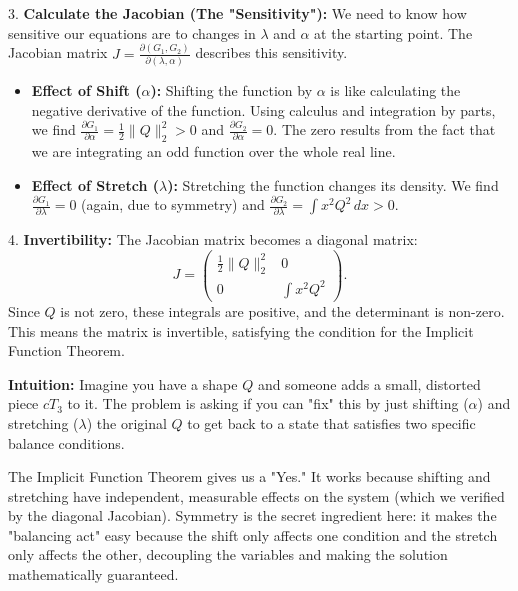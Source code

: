 \begin{solution}
\par\vspace{\baselineskip}
3. \textbf{Calculate the Jacobian (The "Sensitivity"):} We need to know how sensitive our equations are to changes in $\lambda$ and $\alpha$ at the starting point.
The Jacobian matrix $J = \frac{\partial(G_1, G_2)}{\partial(\lambda, \alpha)}$ describes this sensitivity.
\begin{itemize}
    \item \textbf{Effect of Shift ($\alpha$):} Shifting the function by $\alpha$ is like calculating the negative derivative of the function. Using calculus and integration by parts, we find $\frac{\partial G_1}{\partial \alpha} = \frac{1}{2} \|Q\|_2^2 > 0$ and $\frac{\partial G_2}{\partial \alpha} = 0$. The zero results from the fact that we are integrating an odd function over the whole real line.
    \item \textbf{Effect of Stretch ($\lambda$):} Stretching the function changes its density. We find $\frac{\partial G_1}{\partial \lambda} = 0$ (again, due to symmetry) and $\frac{\partial G_2}{\partial \lambda} = \int x^2 Q^2 \, dx > 0$.
\end{itemize}

\par\vspace{\baselineskip}
4. \textbf{Invertibility:} The Jacobian matrix becomes a diagonal matrix:
\[
J = \begin{pmatrix} \frac{1}{2}\|Q\|_2^2 & 0 \\ 0 & \int x^2 Q^2 \end{pmatrix}.
\]
Since $Q$ is not zero, these integrals are positive, and the determinant is non-zero. This means the matrix is invertible, satisfying the condition for the Implicit Function Theorem.

\par\vspace{\baselineskip}
\textbf{Intuition:}
Imagine you have a shape $Q$ and someone adds a small, distorted piece $cT_3$ to it. The problem is asking if you can "fix" this by just shifting ($ \alpha $) and stretching ($ \lambda $) the original $Q$ to get back to a state that satisfies two specific balance conditions.

The Implicit Function Theorem gives us a "Yes." It works because shifting and stretching have independent, measurable effects on the system (which we verified by the diagonal Jacobian). Symmetry is the secret ingredient here: it makes the "balancing act" easy because the shift only affects one condition and the stretch only affects the other, decoupling the variables and making the solution mathematically guaranteed.
\end{solution}

